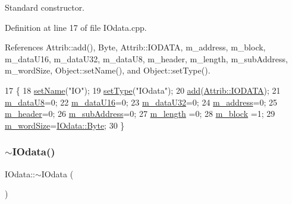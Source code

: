 Standard constructor. 



Definition at line 17 of file I\+Odata.\+cpp.



References Attrib\+::add(), Byte, Attrib\+::\+I\+O\+D\+A\+TA, m\+\_\+address, m\+\_\+block, m\+\_\+data\+U16, m\+\_\+data\+U32, m\+\_\+data\+U8, m\+\_\+header, m\+\_\+length, m\+\_\+sub\+Address, m\+\_\+word\+Size, Object\+::set\+Name(), and Object\+::set\+Type().


\begin{DoxyCode}
17                  \{
18   \hyperlink{classObject_ae30fea75683c2d149b6b6d17c09ecd0c}{setName}(\textcolor{stringliteral}{"IO"});
19   \hyperlink{classObject_aae534cc9d982bcb9b99fd505f2e103a5}{setType}(\textcolor{stringliteral}{"IOdata"});
20   \hyperlink{classAttrib_a235f773af19c900264a190b00a3b4ad7}{add}(\hyperlink{classAttrib_a69e171d7cc6417835a5a306d3c764235a0af3b0d0ac323c1704e6c69cf90add28}{Attrib::IODATA});
21   \hyperlink{classIOdata_a9c4c0dc5104f7f3b170e30ab78fe61e7}{m\_dataU8}=0;
22   \hyperlink{classIOdata_a8d698e077b7898009691b9086a3e6453}{m\_dataU16}=0;
23   \hyperlink{classIOdata_a247cdaefd87084e3cad1d530d592d99a}{m\_dataU32}=0;
24   \hyperlink{classIOdata_a965810e1888b904c575277f50cea734a}{m\_address}=0;
25   \hyperlink{classIOdata_a46ec7dbfa257c02be1d39c4799f157d3}{m\_header}=0;
26   \hyperlink{classIOdata_a562f84e5cace1e392f1b0fca553fff78}{m\_subAddress}=0;
27   \hyperlink{classIOdata_afabe57441da019eb614d277799106aac}{m\_length} =0;
28   \hyperlink{classIOdata_a6d1ce9f88db6b97ce61098a3693e253f}{m\_block}  =1;
29   \hyperlink{classIOdata_a719b0ce607ada4fa91b12d6ecfa1b4c9}{m\_wordSize}=\hyperlink{classIOdata_a37c53ebf4bf8d866aac8af572962a84ca00156611f08eeb1b5d361de809dafb8e}{IOdata::Byte};
30 \}
\end{DoxyCode}
\mbox{\label{classIOdata_a3d7cf860040702b00a925703da7c0648}} 
\subsubsection{\texorpdfstring{$\sim$\+I\+Odata()}{~IOdata()}}
{\footnotesize\ttfamily I\+Odata\+::$\sim$\+I\+Odata (\begin{DoxyParamCaption}{ }\end{DoxyParamCaption})\hspace{0.3cm}{\ttfamily [virtual]}}



